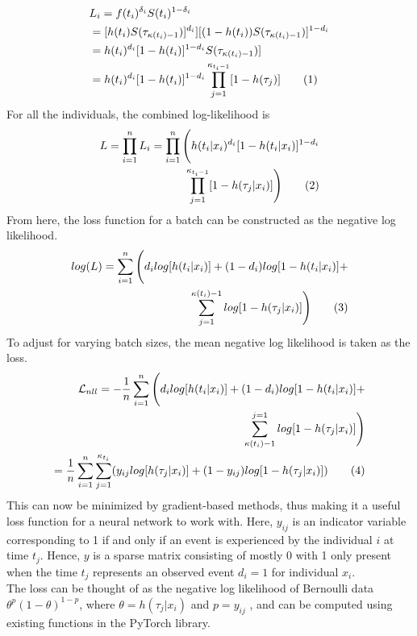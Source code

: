 \documentclass[%
 twocolumn,
 reprint,
 amsmath,amssymb,
 aps,nofootinbib
]{revtex4-2}
\newcommand\numberthis{\addtocounter{equation}{1}\tag{\theequation}} %
\begin{document}
\begin{align*}
&L_i = f(t_i)^{\delta_i}S(t_i)^{1-\delta_i}\\
&= [h(t_i)S(\tau_{\kappa(t_i)-1})]^{d_i}][(1-h(t_i))S(\tau_{\kappa(t_i)-1})]^{1-d_i}\\
&= h(t_i)^{d_i}[1 - h(t_i)]^{1-d_i}S(\tau_{\kappa(t_i)-1})]\\
&= h(t_i)^{d_i}[1 - h(t_i)]^{1-d_i} \prod^{\kappa_{t_i-1}}_{j=1}[1 - h(\tau_j)] \numberthis  \label{eq:ll_contribution}
\end{align*}
For all the individuals, the combined log-likelihood is
\begin{align*}
L = \prod^{n}_{i=1}L_i = \prod^{n}_{i=1}\Bigg(h(t_i|x_i)^{d_i}[1 - h(t_i|x_i)]^{1-d_i} \\
\prod^{\kappa_{t_i-1}}_{j=1}[1 - h(\tau_j|x_i)]\Bigg) \numberthis  \label{eq:ll}
\end{align*}
From here, the loss function for a batch can be constructed as the negative log likelihood.
\begin{align*}
log(L) = \sum^{n}_{i=1}\Bigg(d_i log[h(t_i|x_i)]+(1-d_i)log[1-h(t_i|x_i)]+\\
\sum^{\kappa(t_i)-1}_{j=1}log[1 - h(\tau_j|x_i)] \Bigg) \numberthis  \label{eq:logll}
\end{align*}
To adjust for varying batch sizes, the mean negative log likelihood is taken as the loss.
\begin{align*}
\mathcal{L}_{nll} = -\frac{1}{n}\sum^{n}_{i=1}\Bigg(d_i log[h(t_i|x_i)]+(1-d_i)log[1-h(t_i|x_i)]+\\
\sum^{j=1}_{\kappa(t_i)-1}log[1 - h(\tau_j|x_i)] \Bigg) \\
= \frac{1}{n}\sum^{n}_{i=1}\sum^{\kappa_{t_i}}_{j=1}(y_{ij}log[h(\tau_j|x_i)]+(1-y_{ij})log[1-h(\tau_j|x_i)]) \numberthis  \label{eq:nll}
\end{align*}
This can now be minimized by gradient-based methods, thus making it a useful loss function for a neural network to work with. Here, $y_{ij}$ is an indicator variable corresponding to 1 if and only if an event is experienced by the individual $i$ at time $t_j$. Hence, $y$ is a sparse matrix consisting of mostly 0 with 1 only present when the time $t_j$ represents an observed event $d_i = 1$ for individual $x_i$. \\

The loss can be thought of as the negative log likelihood of Bernoulli data $\theta^p(1-\theta)^{1-p}$, where $\theta=h(\tau_j|x_i)$ and $p=y_{ij}$ \cite{bin_x_entropy_brown}, and can be computed using existing functions in the PyTorch library.\\
\end{document}

